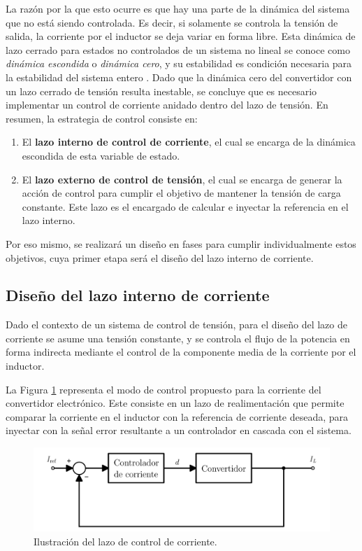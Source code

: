 La razón por la que esto ocurre es que hay una parte de la dinámica del sistema que no está siendo controlada. Es decir, si solamente se controla la tensión de salida, la corriente por el inductor se deja variar en forma libre. Esta dinámica de lazo cerrado para estados no controlados de un sistema no lineal se conoce como \emph{dinámica escondida} o \emph{dinámica cero}, y su estabilidad es condición necesaria para la estabilidad del sistema entero \cite{dynamics}. Dado que la dinámica cero del convertidor con un lazo cerrado de tensión resulta inestable, se concluye que es necesario implementar un control de corriente anidado dentro del lazo de tensión. En resumen, la estrategia de control consiste en:

\begin{enumerate}
  \item El \textbf{lazo interno de control de corriente}, el cual se encarga de la dinámica escondida de esta variable de estado.
  \item El \textbf{lazo externo de control de tensión}, el cual se encarga de generar la acción de control para cumplir el objetivo de mantener la tensión de carga constante. Este lazo es el encargado de calcular e inyectar la referencia en el lazo interno.
\end{enumerate}

Por eso mismo, se realizará un diseño en fases para cumplir individualmente estos objetivos, cuya primer etapa será el diseño del lazo interno de corriente.

\subsection{Diseño del lazo interno de corriente}

Dado el contexto de un sistema de control de tensión, para el diseño del lazo de corriente se asume una tensión constante, y se controla el flujo de la potencia en forma indirecta mediante el control de la componente media de la corriente por el inductor. 

La Figura \ref{lazo-corriente} representa el modo de control propuesto para la corriente del convertidor electrónico. Este consiste en un lazo de realimentación que permite comparar la corriente en el inductor con la referencia de corriente deseada, para inyectar con la señal error resultante a un controlador en cascada con el sistema.

\begin{figure}[hbt!]
  \centering
  \includegraphics[width=0.65\columnwidth]{Imágenes/Diseño del control/Lazo de control de corriente.pdf}
  \caption{Ilustración del lazo de control de corriente.}
  \label{lazo-corriente}
\end{figure} 

